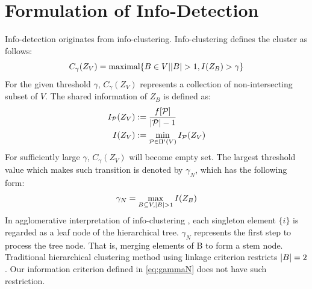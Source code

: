 \documentclass[runningheads]{llncs}
\begin{document}
\section{Formulation of Info-Detection}
Info-detection originates from info-clustering. Info-clustering defines the cluster as follows:
\begin{equation}
C_{\gamma}(Z_V) = \textrm{maximal}\{ B \in V \vert \lvert B\rvert > 1, I(Z_B) > \gamma \}
\end{equation}
For the given threshold $\gamma$, $C_{\gamma} (Z_V)$ represents a collection of non-intersecting subset of $V$. The shared information of $Z_B$ is defined as:
\begin{align}
I_{\mathcal{P}}(Z_V) & := \frac{ f[\mathcal{P}] }{  \lvert\mathcal{P}\rvert - 1 }\\
I(Z_V) & := \min_{\mathcal{P} \in \Pi'(V)} I_{\mathcal{P}}(Z_V)  \label{eq:ms}
\end{align}
For sufficiently large $\gamma$, $C_{\gamma} (Z_V)$ will become empty set. The largest threshold value which makes such transition is denoted by $\gamma_N$, which has the following form:
\begin{equation}\label{eq:gammaN}
\gamma_N = \max_{B\subseteq V, \lvert B\rvert>1} I(Z_B)
\end{equation}
In agglomerative interpretation of info-clustering \cite{RN8}, each singleton element $\{i\}$ is regarded as a leaf node of the hierarchical tree. $\gamma_N$ represents the first step to process the tree node. That is, merging elements of B to form a stem node. Traditional hierarchical clustering method using linkage criterion restricts $\lvert B\rvert=2$. Our information criterion defined in \eqref{eq:gammaN} does not have such restriction. 
\end{document}
